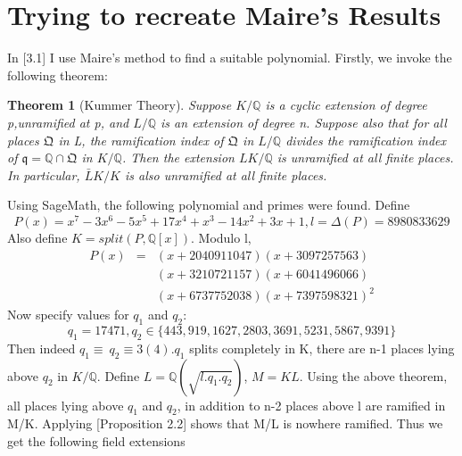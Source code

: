 \documentclass[preprint,12pt,reqno]{elsarticle}
\newtheorem{theorem}{Theorem}
\begin{document}
\section{Trying to recreate Maire's Results}
In \cite{MAIR}[3.1] I use Maire's method to find a suitable polynomial.
Firstly, we invoke the following theorem:
\begin{theorem}[Kummer Theory]
Suppose $K/\mathbb{Q}$ is a cyclic extension of degree p,unramified at p, and $L/\mathbb{Q}$ is an extension of degree n. Suppose also that for all places $\mathfrak{Q}$ in L, the ramification index of $\mathfrak{Q}$ in $L/\mathbb{Q}$ divides the ramification index of $\mathfrak{q} = \mathbb{Q}\cap\mathfrak{Q}$ in $K/\mathbb{Q}$. \newline
Then the extension $LK/\mathbb{Q}$ is unramified at all finite places. In particular, $\bar{L}K/K$ is also unramified at all finite places.
\end{theorem}
Using SageMath, the following polynomial and primes were found. Define 
\begin{equation}
    P(x) = x^7-3x^6-5x^5+17x^4+x^3-14x^2+3x+1, l=\Delta(P)=8980833629
\end{equation}
Also define $K=split(P,\mathbb{Q}[x])$. Modulo l,
\begin{eqnarray*}
        P(x)&=&(x+2040911047)(x+3097257563)\\ & & {} (x+3210721157)(x+6041496066)\\ & & {}(x+6737752038)(x+7397598321)^2
\end{eqnarray*}
Now specify values for $q_1$ and $q_2$:
\begin{equation}
    q_1=17471,q_2\in\{443,919,1627,2803,3691,5231,5867,9391\}
\end{equation}
Then indeed $q_1\equiv\:q_2\equiv3(4)$.$q_1$ splits completely in K, there are n-1 places lying above $q_2$ in $K/\mathbb{Q}$.
\newline
Define $L=\mathbb{Q}(\sqrt{l.q_1.q_2})$, $M=KL$. Using the above theorem, all places lying above $q_1$ and $q_2$, in addition to n-2 places above l are ramified in M/K.  Applying \cite{MAIR}[Proposition 2.2] shows that M/L is nowhere ramified. Thus we get the following field extensions
\begin{center}
\end{center}
\end{document}
